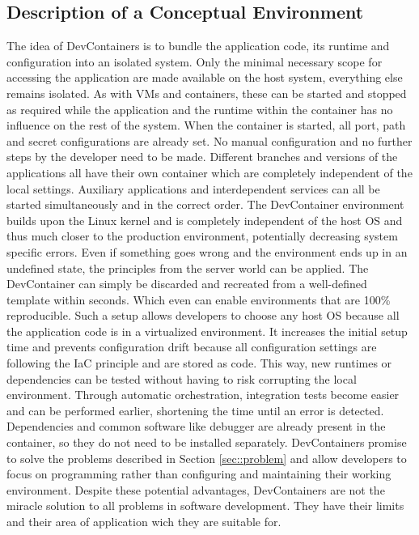 \documentclass[12pt, a4paper]{article}
\begin{document}
    \subsection{Description of a Conceptual Environment}
    The idea of DevContainers is to bundle the application code, its runtime and configuration into an isolated system. Only the minimal necessary scope for accessing the application are made available on the host system, everything else remains isolated. As with \ac{VM}s and containers, these can be started and stopped as required while the application and the runtime within the container has no influence on the rest of the system. When the container is started, all port, path and secret configurations are already set. No manual configuration and no further steps by the developer need to be made. Different branches and versions of the applications all have their own container which are completely independent of the local settings. Auxiliary applications and interdependent services can all be started simultaneously and in the correct order. The DevContainer environment builds upon the Linux kernel and is completely independent of the host \ac{OS} and thus much closer to the production environment, potentially decreasing system specific errors. Even if something goes wrong and the environment ends up in an undefined state, the principles from the server world can be applied. The DevContainer can simply be discarded and recreated from a well-defined template within seconds. Which even can enable environments that are 100\% reproducible.\newline
    Such a setup allows developers to choose any host \acl{OS} because all the application code is in a virtualized environment. It increases the initial setup time and prevents configuration drift because all configuration settings are following the \ac{IaC} principle and are stored as code. This way, new runtimes or dependencies can be tested without having to risk corrupting the local environment. Through automatic orchestration, integration tests become easier and can be performed earlier, shortening the time until an error is detected. Dependencies and common software like debugger are already present in the container, so they do not need to be installed separately. DevContainers promise to solve the problems described in Section \ref{sec::problem} and allow developers to focus on programming rather than configuring and maintaining their working environment.\newline
    Despite these potential advantages, DevContainers are not the miracle solution to all problems in software development. They have their limits and their area of application wich they are suitable for.
\end{document}
